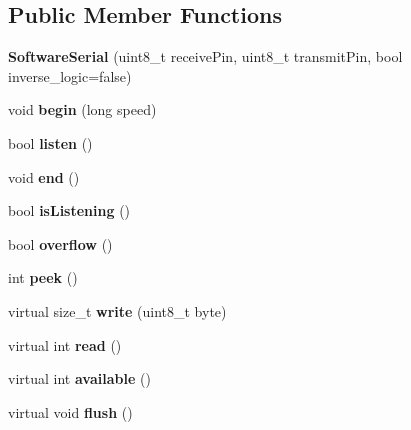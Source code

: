 \subsection*{Public Member Functions}
\begin{DoxyCompactItemize}
\item 
\hypertarget{class_software_serial_aab36336db4a1ca5073071c07d910cb87}{}{\bfseries Software\+Serial} (uint8\+\_\+t receive\+Pin, uint8\+\_\+t transmit\+Pin, bool inverse\+\_\+logic=false)\label{class_software_serial_aab36336db4a1ca5073071c07d910cb87}

\item 
\hypertarget{class_software_serial_af1b194359d70894b3a2f38236a68480e}{}void {\bfseries begin} (long speed)\label{class_software_serial_af1b194359d70894b3a2f38236a68480e}

\item 
\hypertarget{class_software_serial_ad235539ef28939836bd0bde9387eb8fc}{}bool {\bfseries listen} ()\label{class_software_serial_ad235539ef28939836bd0bde9387eb8fc}

\item 
\hypertarget{class_software_serial_a9034270f7de617b3cc7d3f38f3a8e0df}{}void {\bfseries end} ()\label{class_software_serial_a9034270f7de617b3cc7d3f38f3a8e0df}

\item 
\hypertarget{class_software_serial_a7b3fb4a8f57d2b5f2233f841d71ef80f}{}bool {\bfseries is\+Listening} ()\label{class_software_serial_a7b3fb4a8f57d2b5f2233f841d71ef80f}

\item 
\hypertarget{class_software_serial_ac6d4d5dfbe05515bf23766e2c8abfd46}{}bool {\bfseries overflow} ()\label{class_software_serial_ac6d4d5dfbe05515bf23766e2c8abfd46}

\item 
\hypertarget{class_software_serial_a51c2d2e79f0d982b1ef9cc9ac4453648}{}int {\bfseries peek} ()\label{class_software_serial_a51c2d2e79f0d982b1ef9cc9ac4453648}

\item 
\hypertarget{class_software_serial_ac24e5c6af203ec636c0a200b0cb3caf0}{}virtual size\+\_\+t {\bfseries write} (uint8\+\_\+t byte)\label{class_software_serial_ac24e5c6af203ec636c0a200b0cb3caf0}

\item 
\hypertarget{class_software_serial_a2d0b2f2868d519c716114777f482705b}{}virtual int {\bfseries read} ()\label{class_software_serial_a2d0b2f2868d519c716114777f482705b}

\item 
\hypertarget{class_software_serial_a4cbf77a4e90e15ca576972d7952659c5}{}virtual int {\bfseries available} ()\label{class_software_serial_a4cbf77a4e90e15ca576972d7952659c5}

\item 
\hypertarget{class_software_serial_a9a46db376a19fc958e011e38799b902c}{}virtual void {\bfseries flush} ()\label{class_software_serial_a9a46db376a19fc958e011e38799b902c}

\end{DoxyCompactItemize}
